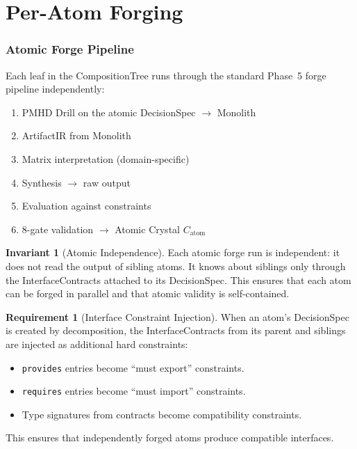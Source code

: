 \documentclass[11pt,a4paper,twoside]{article}
\theoremstyle{definition}
\newtheorem{requirement}{Requirement}[section]
\newtheorem{invariant}{Invariant}[section]
\theoremstyle{plain}
\theoremstyle{remark}
\begin{document}
\part{Per-Atom Forging}\label{part:atomforge}

\section{Atomic Forge Pipeline}\label{sec:atomforge}

Each leaf in the CompositionTree runs through the standard Phase~5
forge pipeline independently:

\begin{enumerate}[nosep]
  \item PMHD Drill on the atomic DecisionSpec $\to$ Monolith
  \item ArtifactIR from Monolith
  \item Matrix interpretation (domain-specific)
  \item Synthesis $\to$ raw output
  \item Evaluation against constraints
  \item 8-gate validation $\to$ Atomic Crystal $C_{\mathrm{atom}}$
\end{enumerate}

\begin{invariant}[Atomic Independence]\label{inv:atomind}
Each atomic forge run is independent: it does not read the output of
sibling atoms. It knows about siblings only through the
InterfaceContracts attached to its DecisionSpec. This ensures that
each atom can be forged in parallel and that atomic validity is
self-contained.
\end{invariant}

\begin{requirement}[Interface Constraint Injection]\label{req:iconstinject}
When an atom's DecisionSpec is created by decomposition, the
InterfaceContracts from its parent and siblings are injected as
additional hard constraints:
\begin{itemize}[nosep]
  \item \texttt{provides} entries become ``must export'' constraints.
  \item \texttt{requires} entries become ``must import'' constraints.
  \item Type signatures from contracts become compatibility constraints.
\end{itemize}
This ensures that independently forged atoms produce compatible
interfaces.
\end{requirement}
\end{document}
